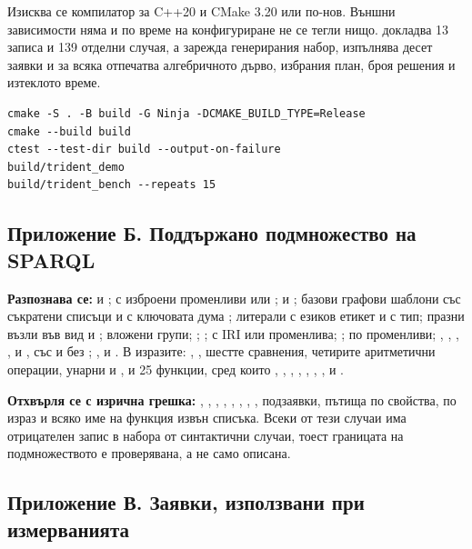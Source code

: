 Изисква се компилатор за C++20 и CMake 3.20 или по-нов. Външни зависимости няма и по време на
конфигуриране не се тегли нищо.  докладва 13 записа и 139 отделни случая, а
 зарежда генерирания набор, изпълнява десет заявки и за всяка отпечатва
алгебричното дърво, избрания план, броя решения и изтеклото време.

\begin{lstlisting}[language={},caption={Изграждане, тестове, демонстрация и измервания}]
cmake -S . -B build -G Ninja -DCMAKE_BUILD_TYPE=Release
cmake --build build
ctest --test-dir build --output-on-failure
build/trident_demo
build/trident_bench --repeats 15
\end{lstlisting}

\subsection*{Приложение Б. Поддържано подмножество на SPARQL}

\textbf{Разпознава се:}  и ;  с изброени променливи или
\code{*};  и ; базови графови шаблони със съкратени списъци и с
ключовата дума ; литерали с езиков етикет и с тип; празни възли във вид
 и \code{[]}; вложени групи; ; ;  с
IRI или променлива; ;
 по променливи; , , , ,  и
, със и без ; ,  и . В
изразите: \code{||}, \code{\&\&}, шестте сравнения, четирите аритметични операции, унарни
\code{!} и \code{-}, и 25 функции, сред които , , ,
, , , ,  и .

\textbf{Отхвърля се с изрична грешка:} , , ,
, , , , ,
подзаявки, пътища по свойства,  по израз и всяко име на функция извън списъка.
Всеки от тези случаи има отрицателен запис в набора от синтактични случаи, тоест границата на
подмножеството е проверявана, а не само описана.

\subsection*{Приложение В. Заявки, използвани при измерванията}

